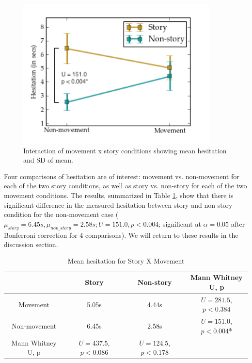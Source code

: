    \begin{figure}[thpb]
      \centering
      \includegraphics[width=4in]{figures/hexbug/has_story_interaction.png}
      \caption{Interaction of movement x story conditions showing mean hesitation and SD of mean.}
      \label{fig_has_story_interaction}
   \end{figure}
   





Four comparisons of hesitation are of interest: movement vs. non-movement for each of the two story conditions, as well as story vs. non-story for each of the two movement conditions. The results, summarized in Table \ref{table_has_story}, show that there is significant difference in the measured hesitation between story and non-story condition for the non-movement case ($\mu_{story}= 6.45s, \mu_{non\_story}=2.58s; U=151.0, p <0.004$; significant at $\alpha=0.05$ after Bonferroni correction for 4 comparisons). We will return to these results in the discussion section.



\begin{table}
\renewcommand{\arraystretch}{1.3}
\caption{Mean hesitation for Story X Movement}
\label{table_has_story}
\centering
\begin{tabular}{c||c|c|c}
\hline
& Story & Non-story & \specialcell{Mann Whitney\\ U, p}\\
\hline\hline

Movement & 5.05s & 4.44s & \specialcell{$U=281.5$,\\$p<0.384$} \\
\hline
Non-movement & 6.45s & 2.58s & \specialcell{$U=151.0$,\\$p<0.004$*}\\
\hline
Mann Whitney U, p & \specialcell{$U=437.5$,\\$p<0.086$} & \specialcell{$U=124.5$,\\$p<0.178$} \\

\hline
\end{tabular}
\end{table}


